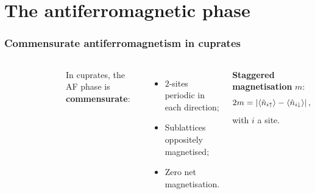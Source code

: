 %
%
%	
%	

\section{The antiferromagnetic phase}

\begin{frame}
	\frametitle{Commensurate antiferromagnetism in cuprates}
	
	\begin{columns}
		\begin{figure}
			\centering
			
		\end{figure}
		\smallskip
		
		In cuprates, the AF phase is \textbf{commensurate}:
		\begin{itemize}
			\item $2$-sites periodic in each direction;
			\item Sublattices oppositely magnetised;
			\item Zero net magnetisation.
		\end{itemize}
		\DownImplication
		\textbf{Staggered magnetisation} $m$:
		\[
		2m = \abs{\ev{\hat n_{i\uparrow}} - \ev{\hat n_{i\downarrow}}} \, \text{,}
		\]
		with $i$ a site.
		
		
	\end{columns}
	
	
\end{frame}

